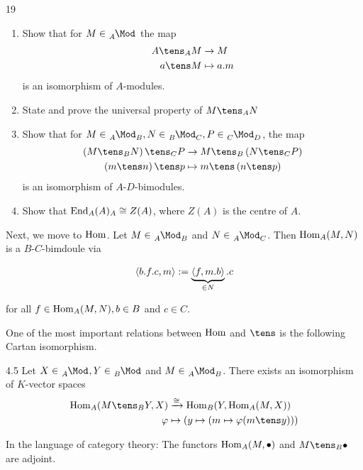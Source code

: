 \documentclass[twoside = false,	%
		headsepline,		%
		parskip = true,
		]{scrbook}						%
\begin{document}
    \begin{exercise}{}{19}
        \begin{enumerate}
            \item Show that for $M \in \tensor[_A]{\Mod}{^{}}$ the map
            \begin{equation*}
            \begin{split}
                A \tens_A M &\to M \\
                a \tens M &\mapsto a.m
            \end{split}
            \end{equation*}
            is an isomorphism of $A$-modules.
            \item State and prove the universal property of $M \tens_A N$
            \item Show that for $M \in \tensor[_A]{\Mod}{_B}, N \in \tensor[_B]{\Mod}{_C}, P \in \tensor[_C]{\Mod}{_D}$, the map
            \begin{equation*}
            \begin{split}
                \round{M \tens_B N} \tens_C P &\to M \tens_B \round{N \tens_C P} \\
                \round{m \tens n} \tens p &\mapsto m \tens \round{n \tens p}
            \end{split}
            \end{equation*}
            is an isomorphism of $A$-$D$-bimodules.
            \item Show that $\mathrm{End}_A(A)_A \cong Z(A)$, where $Z(A)$ is the centre of $A$.
        \end{enumerate}
    \end{exercise}

    Next, we move to $\mathrm{Hom}$. Let $M \in \tensor[_A]{\Mod}{_B}$ and $N \in \tensor[_A]{\Mod}{_C}$. Then $\mathrm{Hom}_A(M,N)$ is a $B$-$C$-bimdoule via

    \begin{equation*}
        \left\langle b.f.c,m\right\rangle := \underbrace{\left\langle f,m.b\right\rangle}_{\in N}.c 
    \end{equation*}

    for all $f \in \mathrm{Hom}_A(M,N), b \in B$ and $c \in C$.

    One of the most important relations between $\mathrm{Hom}$ and $\tens$ is the following Cartan isomorphism.

    \begin{proposition}{}{4.5}
        Let $X \in \tensor[_A]{\Mod}{^{}}, Y \in \tensor[_B]{\Mod}{^{}}$ and $M \in \tensor[_A]{\Mod}{_B}$. There exists an isomorphism of $K$-vector spaces
        \begin{equation*}
        \begin{split}
            \Hom_A(M \tens_B Y, X) &\xrightarrow{\cong} \Hom_B(Y,\Hom_A(M,X)) \\
            \varphi &\mapsto (y \mapsto (m \mapsto \varphi(m \tens y)))
        \end{split}
        \end{equation*}
    \end{proposition}
    In the language of category theory: The functors $\mathrm{Hom}_A(M,\bullet)$ and $M \tens_B \bullet$ are adjoint.
\end{document}
